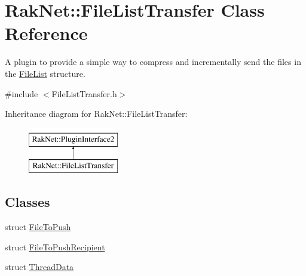 \hypertarget{class_rak_net_1_1_file_list_transfer}{\section{Rak\-Net\-:\-:File\-List\-Transfer Class Reference}
\label{class_rak_net_1_1_file_list_transfer}
}


A plugin to provide a simple way to compress and incrementally send the files in the \hyperlink{class_rak_net_1_1_file_list}{File\-List} structure.  




{\ttfamily \#include $<$File\-List\-Transfer.\-h$>$}

Inheritance diagram for Rak\-Net\-:\-:File\-List\-Transfer\-:\begin{figure}[H]
\begin{center}
\leavevmode
\includegraphics[height=2.000000cm]{class_rak_net_1_1_file_list_transfer}
\end{center}
\end{figure}
\subsection*{Classes}
\begin{DoxyCompactItemize}
\item 
struct \hyperlink{struct_rak_net_1_1_file_list_transfer_1_1_file_to_push}{File\-To\-Push}
\item 
struct \hyperlink{struct_rak_net_1_1_file_list_transfer_1_1_file_to_push_recipient}{File\-To\-Push\-Recipient}
\item 
struct \hyperlink{struct_rak_net_1_1_file_list_transfer_1_1_thread_data}{Thread\-Data}
\end{DoxyCompactItemize}
